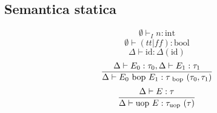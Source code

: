 \documentclass[a4paper]{report}
\newcommand{\bop}{\ \mathrm{bop}\ }
\newcommand{\uop}{\mathrm{uop}\ }
\theoremstyle{definition} \newtheorem*{defi}{Def}
\theoremstyle{plain} \newtheorem{lemma}{Lemma}
\theoremstyle{plain} \newtheorem{teo}{Teorema}
\theoremstyle{remark} \newtheorem*{es}{Esempio}
\DeclareRobustCommand{\frac}[3][0pt]{%
  {\begingroup\hspace{#1}#2\hspace{#1}\endgroup\over\hspace{#1}#3\hspace{#1}}}
\begin{document}
\subsection{Semantica statica}
\begin{equation}
  \emptyset\vdash_I n:\text{int}
  \label{expr_stat_const_int}
\end{equation}
\begin{equation}
  \emptyset \vdash (tt|ff):\text{bool}
  \label{expr_stat_const_bool}
\end{equation}
\begin{equation}
  \Delta \vdash \mathrm{id}:\Delta(\mathrm{id})
  \label{expr_stat_id}
\end{equation}
\begin{equation}
  \frac{
    \Delta \vdash E_0:\tau_0, \Delta \vdash E_1:\tau_1
  }{
    \Delta \vdash E_0 \bop E_1:\tau_{\bop}(\tau_0,\tau_1)
  }
  \label{expr_stat_bop}
\end{equation}
\begin{equation}
  \frac{
    \Delta \vdash E : \tau
  }{
    \Delta \vdash \uop E : \tau_{\uop}(\tau)
  }
  \label{expr_stat_uop}
\end{equation}
\end{document}
